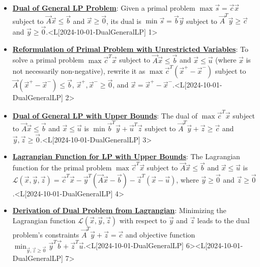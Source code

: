 \documentclass{article}%
\begin{document}
\begin{itemize}[[leftmargin=*]]%
\item \href{https://www.math.purdue.edu/~yipn/421/2024-10-01-DualGeneralLP.pdf#page=1}{\textbf{Dual of General LP Problem}}: Given a primal problem $\max \vec{s} = \vec{c}\vec{x}$ subject to $\vec{A}\vec{x} \le \vec{b}$ and $\vec{x} \ge \vec{0}$, its dual is $\min \vec{s} = \vec{b}\vec{y}$ subject to $\vec{A}^T\vec{y} \ge \vec{c}$ and $\vec{y} \ge \vec{0}$.<L[2024-10-01-DualGeneralLP] 1>%
\item \href{https://www.math.purdue.edu/~yipn/421/2024-10-01-DualGeneralLP.pdf#page=2}{\textbf{Reformulation of Primal Problem with Unrestricted Variables}}: To solve a primal problem $\max \vec{c}^T\vec{x}$ subject to $\vec{A}\vec{x} \le \vec{b}$ and $\vec{x} \le \vec{u}$ (where $\vec{x}$ is not necessarily non-negative), rewrite it as $\max \vec{c}^T(\vec{x}^+ - \vec{x}^-)$ subject to $\vec{A}(\vec{x}^+ - \vec{x}^-) \le \vec{b}$, $\vec{x}^+, \vec{x}^- \ge \vec{0}$, and $\vec{x} = \vec{x}^+ - \vec{x}^-$.<L[2024-10-01-DualGeneralLP] 2>%
\item \href{https://www.math.purdue.edu/~yipn/421/2024-10-01-DualGeneralLP.pdf#page=3}{\textbf{Dual of General LP with Upper Bounds}}: The dual of $\max \vec{c}^T\vec{x}$ subject to $\vec{A}\vec{x} \le \vec{b}$ and $\vec{x} \le \vec{u}$ is $\min \vec{b}^T\vec{y} + \vec{u}^T\vec{z}$ subject to $\vec{A}^T\vec{y} + \vec{z} \ge \vec{c}$ and $\vec{y}, \vec{z} \ge \vec{0}$.<L[2024-10-01-DualGeneralLP] 3>%
\item \href{https://www.math.purdue.edu/~yipn/421/2024-10-01-DualGeneralLP.pdf#page=4}{\textbf{Lagrangian Function for LP with Upper Bounds}}: The Lagrangian function for the primal problem $\max \vec{c}^T\vec{x}$ subject to $\vec{A}\vec{x} \le \vec{b}$ and $\vec{x} \le \vec{u}$ is $\mathcal{L}(\vec{x}, \vec{y}, \vec{z}) = \vec{c}^T\vec{x} - \vec{y}^T(\vec{A}\vec{x} - \vec{b}) - \vec{z}^T(\vec{x} - \vec{u})$, where $\vec{y} \ge \vec{0}$ and $\vec{z} \ge \vec{0}$.<L[2024-10-01-DualGeneralLP] 4>%
\item \href{https://www.math.purdue.edu/~yipn/421/2024-10-01-DualGeneralLP.pdf#page=6}{\textbf{Derivation of Dual Problem from Lagrangian}}: Minimizing the Lagrangian function $\mathcal{L}(\vec{x}, \vec{y}, \vec{z})$ with respect to $\vec{y}$ and $\vec{z}$ leads to the dual problem's constraints $\vec{A}^T\vec{y} + \vec{z} = \vec{c}$ and objective function $\min_{\vec{y}, \vec{z} \ge \vec{0}} \vec{y}^T\vec{b} + \vec{z}^T\vec{u}$.<L[2024-10-01-DualGeneralLP] 6><L[2024-10-01-DualGeneralLP] 7>%
\end{itemize}%
\end{document}
